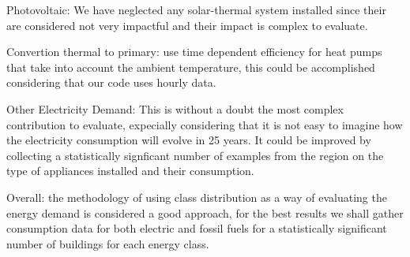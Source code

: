 Photovoltaic: We have neglected any solar-thermal system installed since their are considered not very impactful and their impact is complex to evaluate.

Convertion thermal to primary: use time dependent efficiency for heat pumps that take into account the ambient temperature,
this could be accomplished considering that our code uses hourly data.

Other Electricity Demand: This is without a doubt the most complex contribution to evaluate,
expecially considering that it is not easy to imagine how the electricity consumption will evolve in 25 years.
It could be improved by collecting a statistically signficant number of examples from the region on the type of appliances installed and their consumption.

Overall: the methodology of using class distribution as a way of evaluating the energy demand is considered a good approach,
for the best results we shall gather consumption data for both electric and fossil fuels for a statistically significant number of buildings for each energy class.